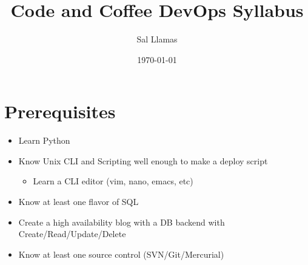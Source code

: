 \documentclass[12pt]{article}
\title{Code and Coffee DevOps Syllabus}
\author{Sal Llamas}
\date{\today}
\begin{document}
\maketitle

\section{Prerequisites}
\begin{itemize}
\item Learn Python
\item Know Unix CLI and Scripting well enough to make a deploy script
  \begin{itemize}
  \item Learn a CLI editor (vim, nano, emacs, etc)
  \end{itemize}
\item Know at least one flavor of SQL
\item Create a high availability blog with a DB backend with
  Create/Read/Update/Delete
\item Know at least one source control (SVN/Git/Mercurial)
\end{itemize}
\end{document}
